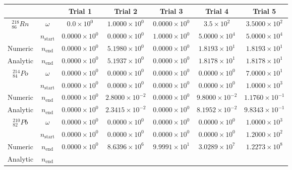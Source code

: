 \begin{table}[h]
\begin{center}
\begin{longtable}{c c c c c c c}
\hline\hline
 &  & Trial 1 & Trial 2 & Trial 3 & Trial 4 & Trial 5 \\
\hline\hline
${}^{218}_{86}Rn$ & $\omega$ & 
${0.0} \times 10^{0}$ & ${1.0000} \times 10^{0}$ & ${0.0000} \times 10^{0}$ &
${3.5} \times 10^{2}$ & ${3.5000} \times 10^{2}$ \\
 & $n_{\text{start}}$ & 
${0.0000} \times 10^{0}$ & ${0.0000} \times 10^{0}$ & ${1.0000} \times 10^{0}$ & 
${5.0000} \times 10^{4}$ & ${5.0000} \times 10^{4}$ \\
Numeric & $n_{\text{end}}$ & 
${0.0000} \times 10^{0}$ & ${5.1980} \times 10^{0}$ & ${0.0000} \times 10^{0}$ & 
${1.8193} \times 10^{1}$ & ${1.8193} \times 10^{1}$ \\
Analytic & $n_{\text{end}}$ & 
${0.0000} \times 10^{0}$ & ${5.1937} \times 10^{0}$ & ${0.0000} \times 10^{0}$ & 
${1.8178} \times 10^{1}$ & ${1.8178} \times 10^{1}$ \\
\hline
${}^{214}_{84}Po$ & $\omega$ & 
${0.0000} \times 10^{0}$ & ${0.0000} \times 10^{0}$ & ${0.0000} \times 10^{0}$ &
${0.0000} \times 10^{0}$ & ${7.0000} \times 10^{1}$ \\
 & $n_{\text{start}}$ & 
${0.0000} \times 10^{0}$ & ${0.0000} \times 10^{0}$ & ${0.0000} \times 10^{0}$ &
${0.0000} \times 10^{0}$ & ${1.0000} \times 10^{3}$ \\
Numeric & $n_{\text{end}}$ & 
${0.0000} \times 10^{0}$ & ${2.8000} \times 10^{-2}$ & ${0.0000} \times 10^{0}$ & 
${9.8000} \times 10^{-2}$ & ${1.1760} \times 10^{-1}$ \\
Analytic & $n_{\text{end}}$ & 
${0.0000} \times 10^{0}$ & ${2.3415} \times 10^{-2}$ & ${0.0000} \times 10^{0}$ & 
${8.1952} \times 10^{-2}$ & ${9.8343} \times 10^{-1}$ \\
\hline
${}^{210}_{82}Pb$ & $\omega$ & 
${0.0000} \times 10^{0}$ & ${0.0000} \times 10^{0}$ & ${0.0000} \times 10^{0}$ &
${0.0000} \times 10^{0}$ & ${1.0000} \times 10^{3}$ \\
 & $n_{\text{start}}$ & 
${0.0000} \times 10^{0}$ & ${0.0000} \times 10^{0}$ & ${0.0000} \times 10^{0}$ &
${0.0000} \times 10^{0}$ & ${1.2000} \times 10^{2}$ \\
Numeric & $n_{\text{end}}$ & 
${0.0000} \times 10^{0}$ & ${8.6396} \times 10^{6}$ & ${9.9991} \times 10^{1}$ & 
${3.0289} \times 10^{7}$ & ${1.2273} \times 10^{8}$ \\
Analytic & $n_{\text{end}}$ & 

\end{longtable}
\end{center}
\end{table}

